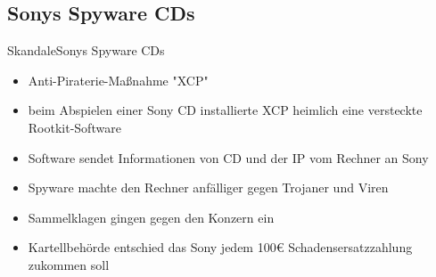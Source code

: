 \documentclass[9pt]{beamer}
\begin{document}
        \subsection{Sonys Spyware CDs}
            \begin{frame}{Skandale}{Sonys Spyware CDs}
                \begin{itemize}
            		\item Anti-Piraterie-Maßnahme "XCP"
            		\item beim Abspielen einer Sony CD installierte XCP heimlich eine versteckte Rootkit-Software
            		\item Software sendet Informationen von CD und der IP vom Rechner an Sony
            		\item Spyware machte den Rechner anfälliger gegen Trojaner und Viren
            		\item Sammelklagen gingen gegen den Konzern ein
            		\item Kartellbehörde entschied das Sony jedem 100€ Schadensersatzzahlung zukommen soll
            	\end{itemize}
            \end{frame}
\end{document}
